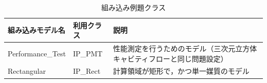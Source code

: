 \begin{table}[htdp]
\caption{組み込み例題クラス}
\begin{center}
\small
\begin{tabular}{lll}\toprule
組み込みモデル名 & 利用クラス & 説明\\ \midrule
Performance\_Test & IP\_PMT & 性能測定を行うためのモデル（三次元立方体キャビティフローと同じ問題設定）\\
Rectangular & IP\_Rect & 計算領域が矩形で，かつ単一媒質のモデル\\
\bottomrule
\end{tabular}
\end{center}
\label{tbl:intrinsic problems}
\end{table}

